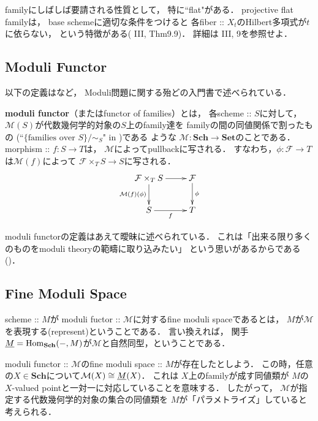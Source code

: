 \documentclass[a4paper]{jsarticle}
\newcommand{\Sch}{\mathbf{Sch}}
\newcommand{\Set}{\mathbf{Set}}
\newcommand{\famF}{\mathcal{F}}
\newcommand{\ftor}[1]{\underline{#1}}
\newcommand{\ftorM}{\mathcal{M}}
\begin{document}
    \begin{Remark}
        familyにしばしば要請される性質として，
        特に``flat"がある．
        projective flat familyは，
        base schemeに適切な条件をつけると
        各fiber :: $X_t$のHilbert多項式が$t$に依らない，
        という特徴がある(\cite{HarAG} III, Thm9.9)．
        詳細は\cite{HarAG} III, 9を参照せよ．
    \end{Remark}

    \subsection{Moduli Functor}
    以下の定義は\cite{HaMo}など，
    Moduli問題に関する殆どの入門書で述べられている．
    \begin{Def}
        \textbf{moduli functor}（またはfunctor of families）とは，
        各scheme :: $S$に対して，
        $\ftorM(S)$が代数幾何学的対象の$S$上のfamily達を
        familyの間の同値関係で割ったもの
        (``$\{ \text{families over }S \}/\sim_S$" in \cite{Hos})である
        ような $\ftorM : \Sch \to \Set$のことである．
        morphism :: $f : S \to T$は，
        $\ftorM$によってpullbackに写される．
        すなわち，$\phi: \famF \to T$は$\ftorM(f)$によって
        $\famF \times_T S \to S$に写される．
        \[\xymatrix{
                \famF \times_T S \ar[d]_-{\ftorM(f)(\phi)}\ar[r]& \famF \ar[d]^-{\phi}\\
            S \ar[r]_-{f}& T
        }\]
    \end{Def}
    moduli functorの定義はあえて曖昧に述べられている．
    これは「出来る限り多くのものをmoduli theoryの範疇に取り込みたい」
    という思いがあるからである(\cite{HaMo})．

    \subsection{Fine Moduli Space}
    \begin{Def}
        scheme :: $M$が
        moduli fuctor :: $\ftorM$に対するfine moduli spaceであるとは，
        $M$が$\ftorM$を表現する(represent)ということである．
        言い換えれば，
        関手$\ftor{M}=\Hom_{\Sch}(-, M)$が$\ftorM$と自然同型，ということである．
    \end{Def}

    \begin{Remark}
        moduli functor :: $\ftorM$のfine moduli space :: $M$が存在したとしよう．
        この時，任意の$X \in \Sch$について$\ftorM(X) \iso \ftor{M}(X)$．
        これは
        $X$上のfamilyが成す同値類が
        $M$の$X$-valued pointと一対一に対応していることを意味する．
        したがって，
        $\ftorM$が指定する代数幾何学的対象の集合の同値類を
        $M$が「パラメトライズ」していると考えられる．
    \end{Remark}
\end{document}
